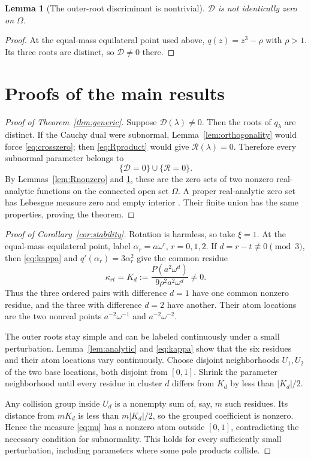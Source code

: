 \documentclass[11pt]{article}
\newtheorem{lemma}[theorem]{Lemma}
\begin{document}
\begin{lemma}[The outer-root discriminant is nontrivial]\label{lem:Dnonzero}
$\mathcal D$ is not identically zero on $\Omega$.
\end{lemma}

\begin{proof}
At the equal-mass equilateral point used above,
$q(z)=z^3-\rho$ with $\rho>1$.  Its three roots are distinct, so
$\mathcal D\ne0$ there.
\end{proof}

\section{Proofs of the main results}

\begin{proof}[Proof of Theorem~\ref{thm:generic}]
Suppose $\mathcal D(\lambda)\ne0$.  Then the roots of $q_\lambda$ are
distinct.  If the Cauchy dual were subnormal,
Lemma~\ref{lem:orthogonality} would force \eqref{eq:crosszero}; then
\eqref{eq:Rproduct} would give $\mathcal R(\lambda)=0$.  Therefore every
subnormal parameter belongs to
\[
 \{\mathcal D=0\}\cup\{\mathcal R=0\}.
\]
By Lemmas~\ref{lem:Rnonzero} and \ref{lem:Dnonzero}, these are the zero sets
of two nonzero real-analytic functions on the connected open set $\Omega$.
A proper real-analytic zero set has Lebesgue measure zero and empty interior
\cite{KP}.  Their finite union has the same properties, proving the theorem.
\end{proof}

\begin{proof}[Proof of Corollary~\ref{cor:stability}]
Rotation is harmless, so take $\xi=1$.  At the equal-mass equilateral point,
label $\alpha_r=a\omega^r$, $r=0,1,2$.  If $d=r-t\not\equiv0\pmod3$, then
\eqref{eq:kappa} and $q'(\alpha_r)=3\alpha_r^2$ give the common residue
\begin{equation}\label{eq:base-residue}
 \kappa_{rt}=K_d:=
 \frac{P(a^2\omega^d)}{9\rho^2a^2\omega^d}\ne0.
\end{equation}
Thus the three ordered pairs with difference $d=1$ have one common nonzero
residue, and the three with difference $d=2$ have another.  Their atom
locations are the two nonreal points
$a^{-2}\omega^{-1}$ and $a^{-2}\omega^{-2}$.

The outer roots stay simple and can be labeled continuously under a small
perturbation.  Lemma~\ref{lem:analytic} and \eqref{eq:kappa} show that the
six residues and their atom locations vary continuously.  Choose disjoint
neighborhoods $U_1,U_2$ of the two base locations, both disjoint from
$[0,1]$.  Shrink the parameter neighborhood until every residue in cluster
$d$ differs from $K_d$ by less than $|K_d|/2$.

Any collision group inside $U_d$ is a nonempty sum of, say, $m$ such
residues.  Its distance from $mK_d$ is less than $m|K_d|/2$, so the grouped
coefficient is nonzero.  Hence the measure \eqref{eq:nu} has a nonzero atom
outside $[0,1]$, contradicting the necessary condition for subnormality.
This holds for every sufficiently small perturbation, including parameters
where some pole products collide.
\end{proof}
\end{document}
